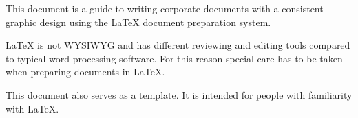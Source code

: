 This document is a guide to writing corporate documents with a consistent graphic design using the LaTeX document preparation system.

LaTeX is not WYSIWYG and has different reviewing and editing tools compared to typical word processing software. For this reason special care has to be taken when preparing documents in LaTeX. 

This document also serves as a template. It is intended for people with familiarity with LaTeX.